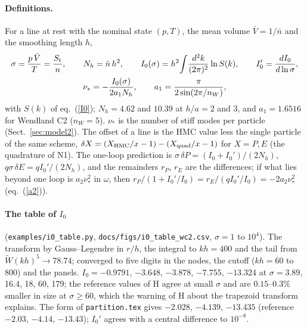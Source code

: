 \documentclass[11pt,aps,preprint,nofootinbib,superscriptaddress,tightenlines]{revtex4-2}
\def\st{\begin{equation}}
\def\stp{\end{equation}}
\def\Eq#1{eq.~(\ref{#1})}
\def\Sect#1{Sect.~\ref{#1}}
\let\oldparagraph\paragraph
\renewcommand{\paragraph}{\par\bigskip\oldparagraph}
\begin{document}
\paragraph{Definitions.}  For a line at rest with the nominal state $(p,T)$, the mean volume $\bar V=1/\bar n$ and the smoothing length $h$,
\st
\begin{gathered}
\sigma=\frac{p\,\bar V}T=\frac{S_{\rm t}}n,\qquad N_h=\bar n\,h^2,\qquad
I_0(\sigma)=h^2\!\int\!\frac{d^2k}{(2\pi)^2}\ln S(k),\qquad I_0'=\frac{dI_0}{d\ln\sigma},\\
\nu_*=-\frac{I_0(\sigma)}{2a_1N_h},\qquad a_1=\frac\pi{2\sin(2\pi/n_W)} ,
\end{gathered}
\stp
with $S(k)$ of \Eq{I0}; $N_h=4.62$ and $10.39$ at $h/a=2$ and 3, and $a_1=1.6516$ for Wendland C2 ($n_W=5$).  $\nu_*$ is the number of stiff
modes per particle (\Sect{sec:model2}).  The offset of a line is the HMC value less the single particle of the same scheme,
$\delta X=(X_{\rm HMC}/x-1)-(X_{\rm quad}/x-1)$ for $X=P,E$ (the quadrature of N1).  The one-loop prediction is $\sigma\,\delta P=(I_0+I_0')/(2N_h)$,
$q\sigma\,\delta E=qI_0'/(2N_h)$, and the remainders $r_P$, $r_E$ are the differences; if what lies beyond one loop is $a_2\nu_*^2$ in $\omega$, then
$r_P/(1+I_0'/I_0)=r_E/(qI_0'/I_0)=-2a_2\nu_*^2$ (\Eq{a2}).

\paragraph{The table of $I_0$} (\nolinkurl{examples/i0_table.py}, \texttt{docs/figs/i0\_table\_wc2.csv}, $\sigma=1$ to $10^4$).  The transform by
Gauss--Legendre in $r/h$, the integral to $kh=400$ and the tail from $\widetilde W(kh)^5\to78.74$; converged to five digits in the nodes, the cutoff
($kh=60$ to 800) and the panels.  $I_0=-0.9791$, $-3.648$, $-3.878$, $-7.755$, $-13.324$ at $\sigma=3.89$, 16.4, 18, 60, 179; the reference values of H
agree at small $\sigma$ and are $0.15$--$0.3\%$ smaller in size at $\sigma\ge60$, which the warning of H about the trapezoid transform explains.  The
form of \nolinkurl{partition.tex} gives $-2.028$, $-4.139$, $-13.435$ (reference $-2.03$, $-4.14$, $-13.43$); $I_0'$ agrees with a central difference
to $10^{-8}$.
\end{document}
